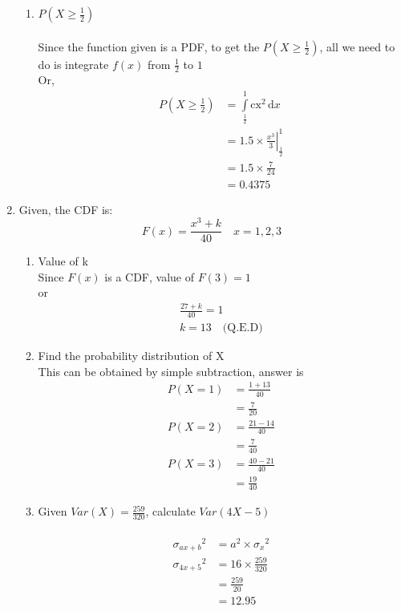 \documentclass[a4paper, 12pt]{article}
\begin{document}
\begin{enumerate}
\begin{enumerate}
		
		\item $P\left(X \geq \frac{1}{2} \right)$
		\\ \\ 
		Since the function given is a PDF, to get the
		$P(X \geq \frac{1}{2})$, all we need to do is
		integrate $f(x)$ from $\frac{1}{2}$ to $1$\\
		Or, 
		\begin{align*}
			P\left(X \geq \frac{1}{2} \right) &=
			\int\limits_{\frac{1}{2}}^{1} 
			\mathrm{cx^2}\,\mathrm{d}x\\
			&= 1.5 \times \left.\frac{x^3}{3}
			\right|_{\frac{1}{2}}^{1}\\
			&= 1.5 \times \frac{7}{24}\\
			&= 0.4375
		\end{align*}
	\end{enumerate}

	\item Given, the CDF is:
	\[
		F(x) = \frac{x^3 + k}{40} \quad x = 1, 2, 3
	\]
	\begin{enumerate}
		\item Value of k\\
		Since $F(x)$ is a CDF, value of $F(3) = 1$\\
		or 
		\begin{align*}
			\frac{27+k}{40} = 1\\
			k = 13 \quad\text{(Q.E.D)}
		\end{align*}

		\item Find the probability distribution of X\\
		This can be obtained by simple subtraction,
		answer is
		\begin{align*}
			P(X=1) &= \frac{1+13}{40}\\
			&= \frac{7}{20}\\
			P(X=2) &= \frac{21-14}{40}\\
			&= \frac{7}{40}\\
			P(X=3) &= \frac{40-21}{40}\\
			&= \frac{19}{40}
		\end{align*}
		
		\item Given $Var(X) = \frac{259}{320}$,
		 calculate $Var(4X-5)$		
		 \\
		 \\
		 \begin{align*}
		 	{\sigma_{ax+b}}^2 &= a^2 \times {\sigma_x}^2\\
		 	{\sigma_{4x+5}}^2 &= 16 \times {\frac{259}{320}}\\
		 	&= \frac{259}{20}\\
		 	&= 12.95
		 \end{align*}
	\end{enumerate}
	

\end{enumerate}
\end{document}
